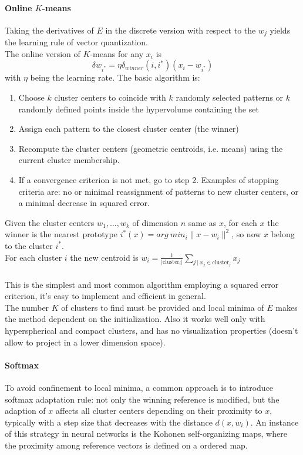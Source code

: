 \documentclass[10pt]{report}
\begin{document}
\paragraph{Online $K$-means} Taking the derivatives of $E$ in the discrete version with respect to the $w_j$ yields the learning rule of vector quantization.\\
The online version of $K$-means for any $x_i$ is $$\delta w_{i^*} = \eta\delta_{winner}(i,i^*)(x_i-w_{i^*})$$
with $\eta$ being the learning rate. The basic algorithm is:
\begin{enumerate}
	\item Choose $k$ cluster centers to coincide with $k$ randomly selected patterns or $k$ randomly defined points inside the hypervolume containing the set
	\item Assign each pattern to the closest cluster center (the winner)
	\item Recompute the cluster centers (geometric centroids, i.e. means) using the current cluster membership.
	\item If a convergence criterion is not met, go to step 2. Examples of stopping criteria are: no or minimal reassignment of patterns to new cluster centers, or a minimal decrease in squared error.
\end{enumerate}
Given the cluster centers $w_1,\ldots,w_k$ of dimension $n$ same as $x$, for each $x$ the winner is the nearest prototype $i^*(x) = arg\:min_i\|x-w_i\|^2$, so now $x$ belong to the cluster $i^*$.\\
For each cluster $i$ the new centroid is $w_i=\frac{1}{|\text{cluster}_i|}\sum_{j\:|\:x_j\in\text{cluster}_j}x_j$\\\\
This is the simplest and most common algorithm employing a squared error criterion, it's easy to implement and efficient in general.\\
The number $K$ of clusters to find must be provided and local minima of $E$ makes the method dependent on the initialization. Also it works well only with hyperspherical and compact clusters, and has no visualization properties (doesn't allow to project in a lower dimension space).
\paragraph{Softmax} To avoid confinement to local minima, a common approach is to introduce softmax adaptation rule: not only the winning reference is modified, but the adaption of $x$ affects all cluster centers depending on their proximity to $x$, typically with a step size that decreases with the distance $d(x,w_i)$. An instance of this strategy in neural networks is the Kohonen self-organizing maps, where the proximity among reference vectors is defined on a ordered map.
\end{document}
